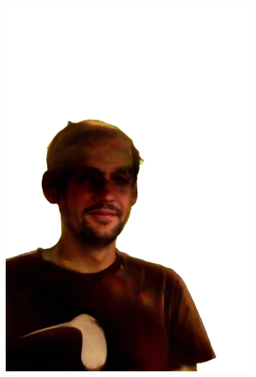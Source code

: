 \begin{figure}[ht]
\begin{subfigure}{0.08\linewidth}
        \includegraphics[width=\textwidth]{Figures/results/low/simon_cowboy/11_render.png}
	\end{subfigure}
    \begin{subfigure}{0.08\linewidth}%

\end{subfigure}
\end{figure}
